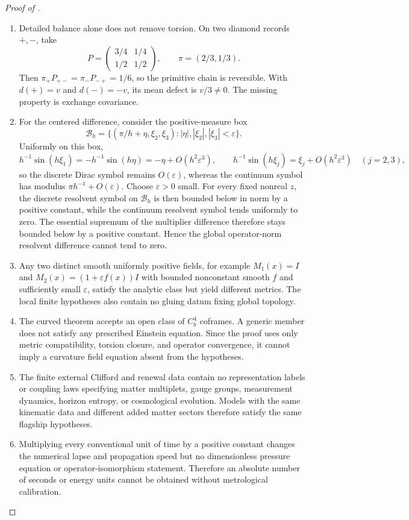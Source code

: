 \documentclass[11pt]{article}
\theoremstyle{definition}
\theoremstyle{remark}
\begin{document}
\begin{proof}[Proof of ]
\begin{enumerate}[label=\textup{(\arabic*)},leftmargin=2.7em]
\item Detailed balance alone does not remove torsion.  On two diamond records
$+,-$, take
\[
 P=\begin{pmatrix}3/4&1/4\\[2pt]1/2&1/2\end{pmatrix},
 \qquad \pi=(2/3,1/3).
\]
Then $\pi_+P_{+-}=\pi_-P_{-+}=1/6$, so the primitive chain is reversible.  With
$d(+)=v$ and $d(-)=-v$, its mean defect is $v/3\ne0$.  The missing property is
exchange covariance.

\item For the centered difference, consider the positive-measure box
\[
 \mathcal B_h=\{(\pi/h+\eta,\xi_2,\xi_3):
 |\eta|,|\xi_2|,|\xi_3|<\varepsilon\}.
\]
Uniformly on this box,
\[
 h^{-1}\sin(h\xi_1)=-h^{-1}\sin(h\eta)
 =-\eta+O(h^2\varepsilon^3),
 \qquad
 h^{-1}\sin(h\xi_j)=\xi_j+O(h^2\varepsilon^3)
 \quad(j=2,3),
\]
so the discrete Dirac symbol remains $O(\varepsilon)$, whereas the continuum
symbol has modulus $\pi h^{-1}+O(\varepsilon)$.  Choose $\varepsilon>0$ small.
For every fixed nonreal $z$, the discrete resolvent symbol on $\mathcal B_h$
is then bounded below in norm by a positive constant, while the continuum
resolvent symbol tends uniformly to zero.  The essential supremum of the
multiplier difference therefore stays bounded below by a positive constant.
Hence the global operator-norm resolvent difference cannot tend to zero.

\item Any two distinct smooth uniformly positive fields, for example
$M_1(x)=I$ and $M_2(x)=(1+\varepsilon f(x))I$ with bounded nonconstant smooth
$f$ and sufficiently small $\varepsilon$, satisfy the analytic class but yield
different metrics.  The local finite hypotheses also contain no gluing datum
fixing global topology.

\item The curved theorem accepts an open class of $C_b^4$ coframes.  A generic
member does not satisfy any prescribed Einstein equation.  Since the proof uses
only metric compatibility, torsion closure, and operator convergence, it cannot
imply a curvature field equation absent from the hypotheses.

\item The finite external Clifford and renewal data contain no representation
labels or coupling laws specifying matter multiplets, gauge groups, measurement
dynamics, horizon entropy, or cosmological evolution.  Models with the same
kinematic data and different added matter sectors therefore satisfy the same
flagship hypotheses.

\item Multiplying every conventional unit of time by a positive constant changes
the numerical lapse and propagation speed but no dimensionless pressure equation
or operator-isomorphism statement.  Therefore an absolute number of seconds or
energy units cannot be obtained without metrological calibration.
\end{enumerate}
\end{proof}
\end{document}
